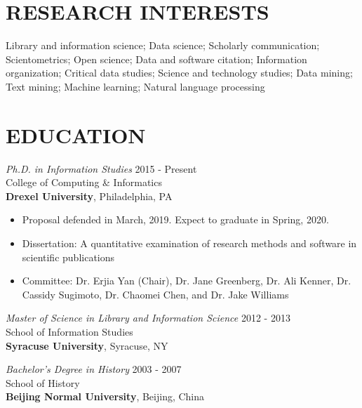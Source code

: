 \documentclass[margin, 10pt]{res} %
\begin{document}
\begin{resume}

 
\section{RESEARCH INTERESTS}  

Library and information science; Data science; Scholarly communication; Scientometrics; Open science; Data and software citation; Information organization; Critical data studies; Science and technology studies; Data mining; Text mining; Machine learning; Natural language processing

 
\section{EDUCATION}

{\sl Ph.D. in Information Studies} \hfill 2015 - Present \\
College of Computing \& Informatics\\
\textbf{Drexel University}, Philadelphia, PA
\begin{itemize}
\item Proposal defended in March, 2019. Expect to graduate in Spring, 2020.
\item Dissertation: A quantitative examination of research methods and software in scientific publications
\item Committee: Dr. Erjia Yan (Chair), Dr. Jane Greenberg, Dr. Ali Kenner, Dr. Cassidy Sugimoto, Dr. Chaomei Chen, and Dr. Jake Williams
\end{itemize} 

{\sl Master of Science in Library and Information Science} \hfill 2012 - 2013 \\
School of Information Studies\\
\textbf{Syracuse University}, Syracuse, NY
 
{\sl Bachelor’s Degree in History} \hfill 2003 - 2007\\
School of History\\
\textbf{Beijing Normal University}, Beijing, China


\end{resume}
\end{document}
